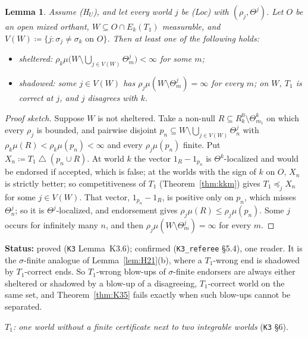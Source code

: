 \documentclass[11pt]{article}
\newtheorem{lemma}[theorem]{Lemma}
\theoremstyle{definition}
\theoremstyle{remark}
\newcommand{\sd}{\mathbin{\triangle}}
\newcommand{\src}[1]{\texttt{#1}}
\newcommand{\status}[1]{\par\smallskip\noindent\textbf{Status:} #1\par\smallskip}
\begin{document}
\begin{lemma}\label{lem:K36}
Assume (H$_U$), and let every world $j$ be (Loc) with $(\rho_j,\Theta^j)$. Let $O$ be an open mixed orthant, $W\subseteq O\cap E_k(T_1)$ measurable, and $V(W)\coloneqq\{j:\sigma_j\ne\sigma_k\text{ on }O\}$. Then at least one of the following holds:
\begin{itemize}[leftmargin=*]
\item[] \emph{sheltered}: $\rho_k\mu\bigl(W\setminus\bigcup_{j\in V(W)}\Theta^j_m\bigr)<\infty$ for some $m$;
\item[] \emph{shadowed}: some $j\in V(W)$ has $\rho_j\mu(W\setminus\Theta^j_m)=\infty$ for every $m$; on $W$, $T_1$ is correct at $j$, and $j$ disagrees with $k$.
\end{itemize}
\end{lemma}
\begin{proof}[Proof sketch]
Suppose $W$ is not sheltered. Take a non-null $R\subseteq R^0_k\setminus\Theta^k_{m_1}$ on which every $\rho_j$ is bounded, and pairwise disjoint $p_n\subseteq W\setminus\bigcup_{j\in V(W)}\Theta^j_n$ with $\rho_k\mu(R)<\rho_k\mu(p_n)<\infty$ and every $\rho_j\mu(p_n)$ finite. Put $X_n\coloneqq T_1\sd(p_n\cup R)$. At world $k$ the vector $1_R-1_{p_n}$ is $\Theta^k$-localized and would be endorsed if accepted, which is false; at the worlds with the sign of $k$ on $O$, $X_n$ is strictly better; so competitiveness of $T_1$ (Theorem~\ref{thm:kkm}) gives $T_1\preceq_jX_n$ for some $j\in V(W)$. That vector, $1_{p_n}-1_R$, is positive only on $p_n$, which misses $\Theta^j_n$; so it is $\Theta^j$-localized, and endorsement gives $\rho_j\mu(R)\le\rho_j\mu(p_n)$. Some $j$ occurs for infinitely many $n$, and then $\rho_j\mu(W\setminus\Theta^j_m)=\infty$ for every $m$.
\end{proof}
\status{proved (\src{K3} Lemma~K3.6); confirmed (\src{K3\_referee} \S5.4), one reader. It is the $\sigma$-finite analogue of Lemma~\ref{lem:H21}(b), where a $T_1$-wrong end is shadowed by $T_1$-correct ends. So $T_1$-wrong blow-ups of $\sigma$-finite endorsers are always either sheltered or shadowed by a blow-up of a disagreeing, $T_1$-correct world on the same set, and Theorem~\ref{thm:K35} fails exactly when such blow-ups cannot be separated.}

\emph{$T_1$: one world without a finite certificate next to two integrable worlds} (\src{K3} \S6).
\end{document}
